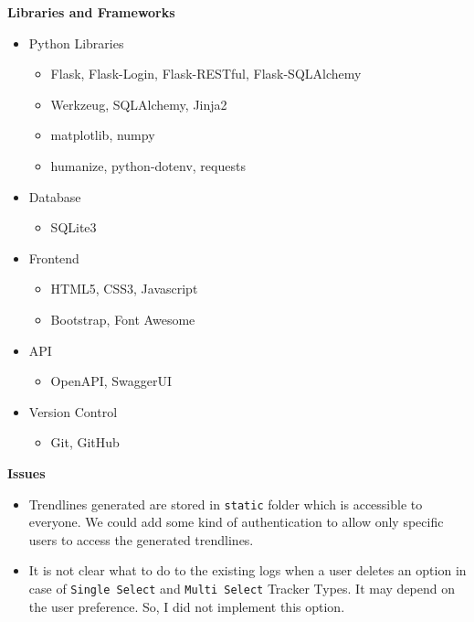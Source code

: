 \documentclass{article}
\begin{document}
\vspace{1cm}
{\huge \textbf{Libraries and Frameworks}}\\
\begin{itemize}
    \item Python Libraries
        \begin{itemize}
            \item Flask, Flask-Login, Flask-RESTful, Flask-SQLAlchemy
            \item Werkzeug, SQLAlchemy, Jinja2
            \item matplotlib, numpy
            \item humanize, python-dotenv, requests
        \end{itemize}
    \item Database
        \begin{itemize}
            \item SQLite3
        \end{itemize}
    \item Frontend
        \begin{itemize}
            \item HTML5, CSS3, Javascript
            \item Bootstrap, Font Awesome
        \end{itemize}
    \item API
        \begin{itemize}
            \item OpenAPI, SwaggerUI
        \end{itemize}
    \item Version Control
        \begin{itemize}
            \item Git, GitHub
        \end{itemize}
\end{itemize}

\vspace{1cm}
{\huge \textbf{Issues}}\\
\begin{itemize}
    \item Trendlines generated are stored in \verb|static| folder which is accessible to everyone. We could add some kind of authentication to allow only specific users to access the generated trendlines.
    \item It is not clear what to do to the existing logs when a user deletes an option in case of \verb|Single Select| and \verb|Multi Select| Tracker Types. It may depend on the user preference. So, I did not implement this option.
\end{itemize}
\end{document}
